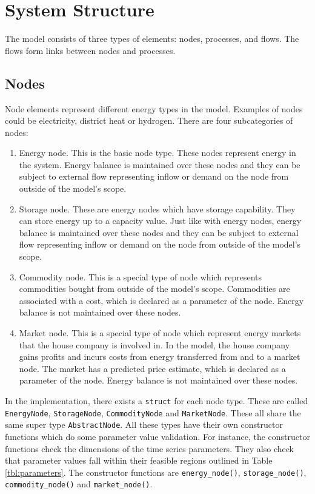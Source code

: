 \documentclass{article}
\begin{document}
\section{System Structure}

The model consists of three types of elements: nodes, processes, and flows. The flows form links between nodes and processes. 

\subsection{Nodes}
Node elements represent different energy types in the model. Examples of nodes could be electricity, district heat or hydrogen. There are four subcategories of nodes:
\begin{enumerate}

    \item Energy node. This is the basic node type. These nodes represent energy in the system. Energy balance is maintained over these nodes and they can be subject to external flow representing inflow or demand on the node from outside of the model's scope. 
    
    \item Storage node. These are energy nodes which have storage capability. They can store energy up to a capacity value. Just like with energy nodes, energy balance is maintained over these nodes and they can be subject to external flow representing inflow or demand on the node from outside of the model's scope. 
    
    \item Commodity node. This is a special type of node which represents commodities bought from outside of the model's scope. Commodities are associated with a cost, which is declared as a parameter of the node. Energy balance is not maintained over these nodes. 
    
    \item Market node. This is a special type of node which represent energy markets that the house company is involved in. In the model, the house company gains profits and incurs costs from energy transferred from and to a market node. The market has a predicted price estimate, which is declared as a parameter of the node. Energy balance is not maintained over these nodes.
\end{enumerate}


In the implementation, there exists a \texttt{struct} for each node type. These are called \texttt{EnergyNode}, \texttt{StorageNode}, \texttt{CommodityNode} and \texttt{MarketNode}. These all share the same super type \texttt{AbstractNode}. All these types have their own constructor functions which do some parameter value validation. For instance, the constructor functions check the dimensions of the time series parameters. They also check that parameter values fall within their feasible regions outlined in Table \ref{tbl:parameters}. The constructor functions are \texttt{energy\_node()}, \texttt{storage\_node()}, \texttt{commodity\_node()} and \texttt{market\_node()}.
\end{document}

